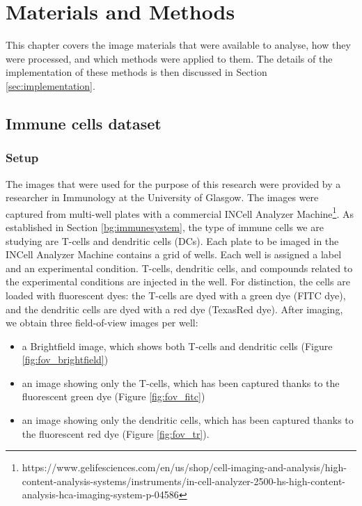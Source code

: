 
\chapter{Materials and Methods} \label{sec:mm}

This chapter covers the image materials that were available to analyse, how they were processed, and which methods were applied to them. The details of the implementation of these methods is then discussed in Section \ref{sec:implementation}.

\section{Immune cells dataset}

\subsection{Setup}

The images that were used for the purpose of this research were provided by a researcher in Immunology at the University of Glasgow. The images were captured from multi-well plates with a commercial INCell Analyzer Machine\footnote{https://www.gelifesciences.com/en/us/shop/cell-imaging-and-analysis/high-content-analysis-systems/instruments/in-cell-analyzer-2500-hs-high-content-analysis-hca-imaging-system-p-04586}. As established in Section \ref{bg:immunesystem}, the type of immune cells we are studying are T-cells and dendritic cells (DCs). Each plate to be imaged in the INCell Analyzer Machine contains a grid of wells. Each well is assigned a label and an experimental condition. T-cells, dendritic cells, and compounds related to the experimental conditions are injected in the well. For distinction, the cells are loaded with fluorescent dyes: the T-cells are dyed with a green dye (FITC dye), and the dendritic cells are dyed with a red dye (TexasRed dye). After imaging, we obtain three field-of-view images per well:

\begin{itemize}
    \item a Brightfield image, which shows both T-cells and dendritic cells (Figure \ref{fig:fov_brightfield})
    \item an image showing only the T-cells, which has been captured thanks to the fluorescent green dye (Figure \ref{fig:fov_fitc})
    \item an image showing only the dendritic cells, which has been captured thanks to the fluorescent red dye (Figure \ref{fig:fov_tr}).
\end{itemize}

